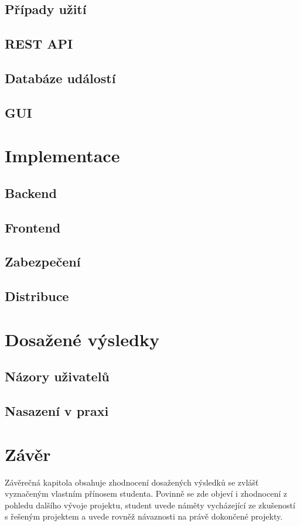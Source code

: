 \section{Případy užití}
\section{REST API}
\section{Databáze událostí}
\section{GUI}

\chapter{Implementace}
\section{Backend}
\section{Frontend}
\section{Zabezpečení}
\section{Distribuce}

\chapter{Dosažené výsledky}
\section{Názory uživatelů}
\section{Nasazení v praxi}

\chapter{Závěr}
Závěrečná kapitola obsahuje zhodnocení dosažených výsledků se zvlášť vyznačeným vlastním přínosem studenta. Povinně se zde objeví i zhodnocení z pohledu dalšího vývoje projektu, student uvede náměty vycházející ze zkušeností s řešeným projektem a uvede rovněž návaznosti na právě dokončené projekty.

